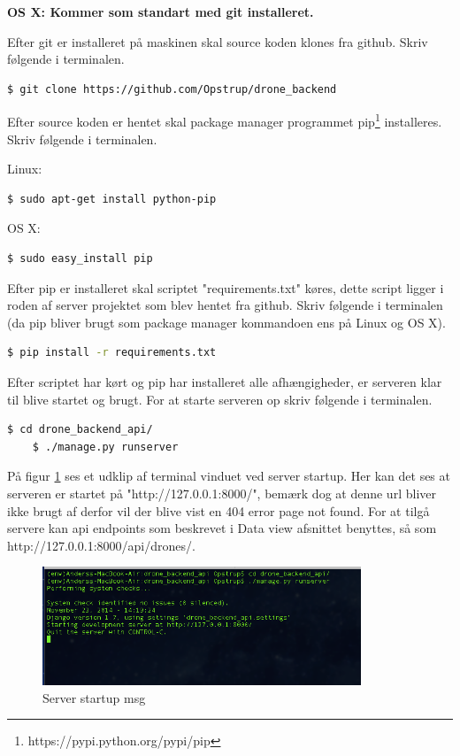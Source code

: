 \textbf{OS X: Kommer som standart med git installeret.}

Efter git er installeret på maskinen skal source koden klones fra github. Skriv følgende i terminalen.

\begin{lstlisting}[language=bash]
	$ git clone https://github.com/Opstrup/drone_backend
\end{lstlisting}

Efter source koden er hentet skal package manager programmet pip\footnote{https://pypi.python.org/pypi/pip} installeres. Skriv følgende i terminalen.

Linux:
\begin{lstlisting}[language=bash]
	$ sudo apt-get install python-pip
\end{lstlisting}

OS X:
\begin{lstlisting}[language=bash]
	$ sudo easy_install pip
\end{lstlisting}

Efter pip er installeret skal scriptet "requirements.txt" køres, dette script ligger i roden af server projektet som blev hentet fra github. Skriv følgende i terminalen (da pip bliver brugt som package manager kommandoen ens på Linux og OS X). \\

\begin{lstlisting}[language=bash]
	$ pip install -r requirements.txt
\end{lstlisting}

Efter scriptet har kørt og pip har installeret alle afhængigheder, er serveren klar til blive startet og brugt. For at starte serveren op skriv følgende i terminalen.

\begin{lstlisting}[language=bash]
	$ cd drone_backend_api/
	$ ./manage.py runserver
\end{lstlisting}


På figur \ref{fig:server_startup} ses et udklip af terminal vinduet ved server startup. Her kan det ses at serveren er startet på "http://127.0.0.1:8000/", bemærk dog at denne url bliver ikke brugt af derfor vil der blive vist en 404 error page not found. For at tilgå servere kan api endpoints som beskrevet i Data view afsnittet benyttes, så som http://127.0.0.1:8000/api/drones/.
\begin{figure}[H]
	\centering
	\includegraphics[width=0.85\textwidth]{Billeder/implementation/server_startup.png}
	\caption{Server startup msg}
	\label{fig:server_startup}
\end{figure}
\newpage

